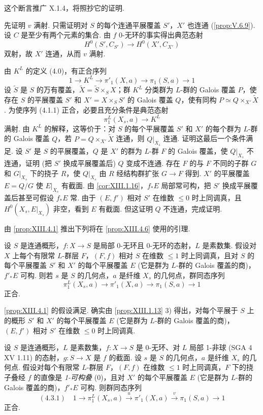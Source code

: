 这个断言推广 X.1.4，将照抄它的证明.

先证明 $v$ 满射. 只需证明对 $S$ 的每个连通平展覆盖 $S'$，$X'$ 也连通 (\cref{prop:V.6.9}). 设 $C$ 是至少有两个元素的集合. 由 $f$ 0-无环的事实得出典范态射
\[
H^0(S', C_{S'}) \longrightarrow H^0(X', C_{X'})
\]
双射，故 $X'$ 连通，从而 $v$ 满射.

由 $K^L$ 的定义 (4.0)，有正合序列
\[
1 \longrightarrow K^L \longrightarrow \pi'_1(X, a) \longrightarrow \pi_1(S, a) \longrightarrow 1
\]
设 $\widetilde{S}$ 是 $S$ 的万有覆盖，$\widetilde{X} = \widetilde{S} \times_S X$；群 $K^L$ 分类群为 $L$-群的 Galois 覆盖 $P$，使存在 $S$ 的平展覆盖 $S'$ 和 $X' = X \times_S S'$ 的 Galois 覆盖 $Q$，使有同构 $P \simeq Q \times_{X'} \widetilde{X}$. 为使序列 (4.1.1) 正合，必要且充分条件是典范态射
\[
\pi^L_1(X_s, a) \longrightarrow K^L
\]
满射. 由 $K^L$ 的解释，这等价于：对 $S$ 的每个平展覆盖 $S'$ 和 $X'$ 的每个群为 $L$-群的 Galois 覆盖 $Q$，若 $P = Q \times_{X'} \widetilde{X}$ 连通，则 $Q|_{X_s}$ 连通. 证明这最后一个条件满足. 设 $S'$ 是 $S$ 的平展覆盖，$Q$ 是 $X'$ 的群为 $L$-群 $F$ 的 Galois 覆盖，使 $Q|_{X_s}$ 不连通，证明 (把 $S'$ 换成平展覆盖后) $Q$ 变成不连通. 存在 $F$ 的与 $F$ 不同的子群 $G$ 和 $G|_{X_s}$ 下的挠子 $R$，使 $Q|_{X_s}$ 由 $R$ 经结构群扩张 $G \to F$ 得到. $X'$ 的平展覆盖 $E = Q/G$ 使 $E|_{X_s}$ 有截面. 由 \ref{cor:XIII.1.16}，$f_* E$ 局部常可构，把 $S'$ 换成平展覆盖后甚至可假设 $f_* E$ 常. 由于 $(E, f')$ 相对 $S'$ 在维数 $\leqslant 0$ 时上同调真，且 $H^0(X_s, E|_{X_s})$ 非空，看到 $E$ 有截面. 但这证明 $Q$ 不连通，完成证明.

由 \ref{prop:XIII.4.1} 推出下列将在 \ref{prop:XIII.4.6} 使用的引理.

\begin{lemma}\label{lem:XIII.4.2}
设 $S$ 是连通概形，$f \colon X \to S$ 是局部 0-无环且 0-无环的态射，$L$ 是素数集. 假设对 $X$ 上每个有限常 $L$-群层 $F$，$(F, f)$ 相对 $S$ 在维数 $\leqslant 1$ 时上同调真，且对 $S$ 的每个平展覆盖 $S'$ 和 $X'$ 的每个平展覆盖 $E$ (它是群为 $L$-群的 Galois 覆盖的商)，$f'_* E$ 可构. 则若 $s$ 是 $S$ 的几何点，$a$ 是纤维 $X_s$ 的几何点，群同态序列
\[
\pi^L_1(X_s, a) \longrightarrow \pi'_1(X, a) \longrightarrow \pi_1(S, a) \longrightarrow 1
\]
正合.
\end{lemma}

\ref{prop:XIII.4.1} 的假设满足. 确实由 \ref{prop:XIII.1.13} 3) 得出，对每个平展于 $S$ 上的概形 $S'$ 和 $X'$ 的每个平展覆盖 $E$ (它是群为 $L$-群的 Galois 覆盖的商)，$(E, f')$ 相对 $S'$ 在维数 $\leqslant 0$ 时上同调真.

\begin{proposition}\label{prop:XIII.4.3}
设 $S$ 是连通概形，$L$ 是素数集，$f \colon X \to S$ 是 0-无环、对 $L$ 局部 1-非球 (SGA 4 XV 1.11) 的态射，$g \colon S \to X$ 是 $f$ 的截面. 设 $s$ 是 $S$ 的几何点，$a$ 是纤维 $X_s$ 的几何点. 假设对每个有限常 $L$-群层 $F$，$(F, f)$ 在维数 $\leqslant 1$ 时上同调真，$F$ 下的挠子叠经 $f$ 的直像是 \emph{1-可构叠} (0)，且对 $X'$ 的每个平展覆盖 $E$ (它是群为 $L$-群的 Galois 覆盖的商)，$f'_* E$ 可构. 则群同态序列
\[
(4.3.1) \quad 1 \longrightarrow \pi^L_1(X_s, a) \xrightarrow{u} \pi'_1(X, a) \xrightarrow{v} \pi_1(S, a) \longrightarrow 1
\]
正合.
\end{proposition}

